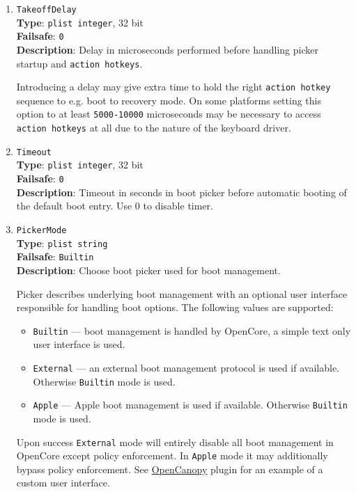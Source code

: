 \documentclass[]{article}
\providecommand{\tightlist}{%
  \setlength{\itemsep}{0pt}\setlength{\parskip}{0pt}}
\begin{document}
\begin{enumerate}
\item
  \texttt{TakeoffDelay}\\
  \textbf{Type}: \texttt{plist\ integer}, 32 bit\\
  \textbf{Failsafe}: \texttt{0}\\
  \textbf{Description}: Delay in microseconds performed before handling
  picker startup and \texttt{action hotkeys}.

  Introducing a delay may give extra time to hold the right \texttt{action hotkey}
  sequence to e.g. boot to recovery mode. On some platforms setting this option to
  at least \texttt{5000-10000} microseconds may be necessary to access
  \texttt{action hotkeys} at all due to the nature of the keyboard driver.

\item
  \texttt{Timeout}\\
  \textbf{Type}: \texttt{plist\ integer}, 32 bit\\
  \textbf{Failsafe}: \texttt{0}\\
  \textbf{Description}: Timeout in seconds in boot picker before
  automatic booting of the default boot entry. Use 0 to disable timer.

\item
  \texttt{PickerMode}\\
  \textbf{Type}: \texttt{plist\ string}\\
  \textbf{Failsafe}: \texttt{Builtin}\\
  \textbf{Description}: Choose boot picker used for boot management.

  Picker describes underlying boot management with an optional user interface
  responsible for handling boot options. The following values are supported:

  \begin{itemize}
  \tightlist
  \item \texttt{Builtin} --- boot management is handled by OpenCore, a simple
  text only user interface is used.
  \item \texttt{External} --- an external boot management protocol is used
  if available. Otherwise \texttt{Builtin} mode is used.
  \item \texttt{Apple} --- Apple boot management is used if available.
  Otherwise \texttt{Builtin} mode is used.
  \end{itemize}

  Upon success \texttt{External} mode will entirely disable all boot management
  in OpenCore except policy enforcement. In \texttt{Apple} mode it may additionally
  bypass policy enforcement. See \hyperref[ueficanopy]{OpenCanopy} plugin
  for an example of a custom user interface.


\end{enumerate}
\end{document}
